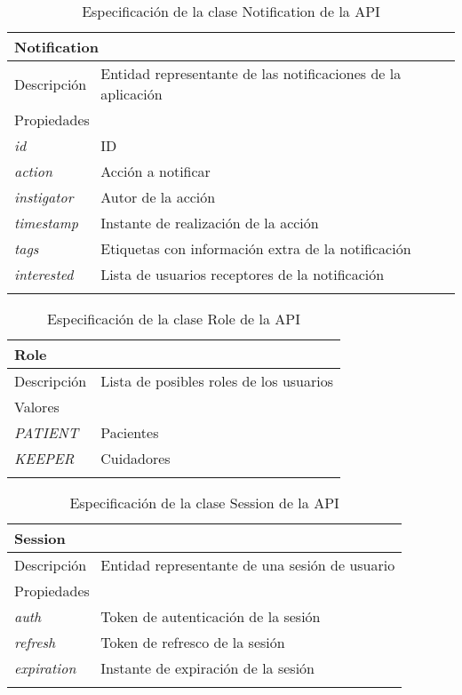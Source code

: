 \begin{longtable}{|p{} p{}|}
    \hline
    \multicolumn{2}{|l|}{Notification} \\ \hline \hline
    Descripción      & Entidad representante de las notificaciones de la aplicación \\ \hline
    \multicolumn{2}{|l|}{Propiedades} \\
    \emph{id}  & ID  \\
    \emph{action}  & Acción a notificar  \\
    \emph{instigator}  & Autor de la acción  \\
    \emph{timestamp}  & Instante de realización de la acción  \\
    \emph{tags}  & Etiquetas con información extra de la notificación  \\
    \emph{interested}  & Lista de usuarios receptores de la notificación  \\ \hline
    \caption{Especificación de la clase Notification de la API}
    \label{class:api:notification}
\end{longtable}

\begin{longtable}{|p{} p{}|}
    \hline
    \multicolumn{2}{|l|}{Role} \\ \hline \hline
    Descripción      & Lista de posibles roles de los usuarios \\ \hline
    \multicolumn{2}{|l|}{Valores} \\
    \emph{PATIENT}  & Pacientes  \\
    \emph{KEEPER}  & Cuidadores  \\ \hline
    \caption{Especificación de la clase Role de la API}
    \label{class:api:role}
\end{longtable}

\begin{longtable}{|p{} p{}|}
    \hline
    \multicolumn{2}{|l|}{Session} \\ \hline \hline
    Descripción      & Entidad representante de una sesión de usuario \\ \hline
    \multicolumn{2}{|l|}{Propiedades} \\
    \emph{auth}  & Token de autenticación de la sesión  \\
    \emph{refresh}  & Token de refresco de la sesión  \\
    \emph{expiration}  & Instante de expiración de la sesión  \\ \hline
    \caption{Especificación de la clase Session de la API}
    \label{class:api:session}
\end{longtable}

